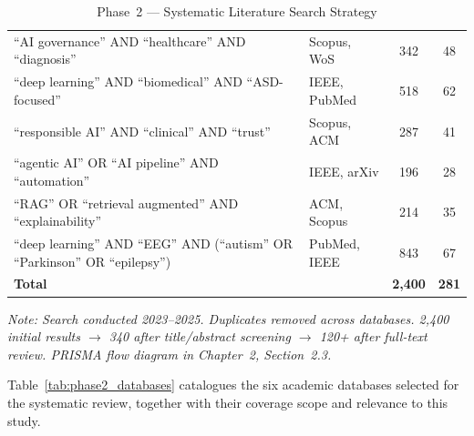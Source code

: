 \begingroup\singlespacing\tablefontsize\tablestripes
\begin{xltabular}{\textwidth}{@{} X l c c @{}}
\caption{Phase~2 --- Systematic Literature Search Strategy}
\label{tab:phase2_search}\\
\toprule
{} &  &  &  \\
\midrule
\endfirsthead
\endhead
\bottomrule
\endlastfoot
``AI governance'' AND ``healthcare'' AND ``diagnosis''                              & Scopus, WoS    & 342 & 48 \\
\addlinespace
``deep learning'' AND ``biomedical'' AND ``ASD-focused''                        & IEEE, PubMed   & 518 & 62 \\
\addlinespace
``responsible AI'' AND ``clinical'' AND ``trust''                                   & Scopus, ACM    & 287 & 41 \\
\addlinespace
``agentic AI'' OR ``AI pipeline'' AND ``automation''                                & IEEE, arXiv    & 196 & 28 \\
\addlinespace
``RAG'' OR ``retrieval augmented'' AND ``explainability''                           & ACM, Scopus    & 214 & 35 \\
\addlinespace
``deep learning'' AND ``EEG'' AND (``autism'' OR ``Parkinson'' OR ``epilepsy'')     & PubMed, IEEE   & 843 & 67 \\
\midrule
\textbf{Total}                                                                      &                & \textbf{2,400} & \textbf{281} \\
\end{xltabular}
\par\vspace{2pt}
\noindent\begin{minipage}{\textwidth}\textit{Note: Search conducted 2023--2025. Duplicates removed across databases. 2,400 initial results $\rightarrow$ 340 after title/abstract screening $\rightarrow$ 120+ after full-text review. PRISMA flow diagram in Chapter~2, Section~2.3.}\end{minipage}
\endgroup

\vspace{1.5em}

Table~\ref{tab:phase2_databases} catalogues the six academic databases selected for the systematic review, together with their coverage scope and relevance to this study.

